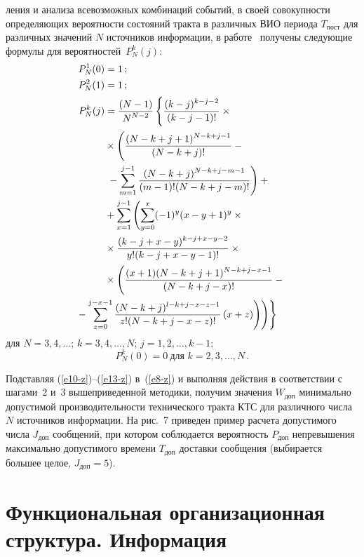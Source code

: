 \begin{multicols}{2}
\addtocounter{figure}{1}

\noindent
 ления и анализа всевозможных комбинаций событий, в своей совокупности 
определяющих вероятности состояний тракта в различных ВИО периода 
$T_{\mathrm{пост}}$ для различных значений $N$ источников информации, в 
работе~\cite{6-z} получены следующие формулы для вероятностей~$P^k_N(j)$:
\begin{align}
P^1_N(0)&=1\,;\label{e10-z}\\
P^2_N(1) &=1\,;\label{e11-z}\\
P_N^k(j) &=\fr{(N-1)}{N^{N-2}}\left \{ 
\vphantom{\sum\limits_{m=1}^{j-1}}
\fr{(k-j)^{k-j-2}}{(k-j-1)!}\times{}\right.\notag\\
& {}\times\left( \vphantom{\sum\limits_{m=1}^{j-1}}
\fr{(N-k+j+1)^{N-k+j-1}}{(N-k+j)!}-{}\right.\notag\\
&\left.{}-
\sum\limits_{m=1}^{j-1}\fr{(N-k+j)^{N-k+j-m-1}}{(m-1)! (N-k+j-m)!}\right)+{}\notag\\
&{}+\sum\limits_{x=1}^{j-1} \left( 
\sum\limits_{y=0}^x (-1)^y(x-y+1)^y\times{}\right.\notag\\
&{}\times \fr{(k-j+x-y)^{k-j+x-
y-2}}{y!(k-j+x-y-1)!}\times{}\notag\\
&{}\times \left( \vphantom{\sum\limits_{z=0}^{j-x-1}}
\fr{(x+1)(N-k+j+1)^{N-k+j-x-1}}{(N-k+j-x)!}-{}\right.\notag\\
&\hspace*{-12mm}\left.\left.\left.{}-\sum\limits_{z=0}^{j-x-1}\fr{(N-k+j)^{l-k+j-x-z-1}}{z!(N-k+j-x-
z)!}\,(x+z)\right)\right)\right\}\!\label{e12-z}
\end{align}
для $N = 3, 4, \ldots$; $k = 3, 4, \ldots , N$; $j = 1, 2, \ldots , k- 1$;
\begin{equation}
P^k_N(0)=0 \ \mbox{для\ }k=2, 3, \ldots , N\,.
\label{e13-z}
\end{equation}

Подставляя (\ref{e10-z})--(\ref{e13-z}) в~(\ref{e8-z}) и выполняя действия в соответствии с 
шагами~2 и~3 вышеприведенной методики, получим значения $W_{\mathrm{доп}}$ 
минимально допустимой производительности технического тракта КТС для различного 
числа $N$ источников информации. На рис.~7 приведен пример расчета допустимого 
числа $J_{\mathrm{доп}}$ сообщений, при котором соблюдается вероятность 
$P_{\mathrm{доп}}$ непревышения максимально допустимого времени $T_{\mathrm{доп}}$ 
доставки сообщения (выбирается большее целое, $J_{\mathrm{доп}} = 5$).


\section{Функциональная организационная структура. Информация}
     

\end{multicols}
